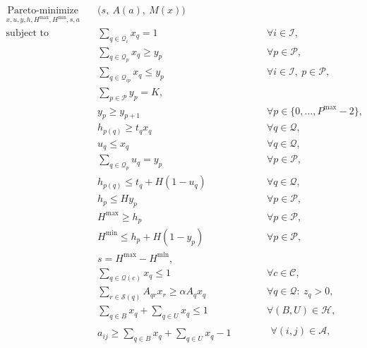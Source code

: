 \documentclass[11pt]{article}
\newcommand{\Item}{\mathcal{I}}
\newcommand{\Pallet}{\mathcal{P}}
\newcommand{\Place}{\mathcal{Q}}
\newcommand{\Cell}{\mathcal{C}}
\newcommand{\Support}{\mathcal{S}}
\begin{document}
\begin{subequations}
\label{model:complete}
\begin{alignat}{3}
  \underset{x,u,y,h,H^{\max},H^{\min},s,a}{\operatorname{Pareto-minimize}}
  \quad & \bigl(s,\ A(a),\ M(x)\bigr)
  \label{model:objective}\\[0.3em]
  \text{subject to}\quad
  & \sum_{q\in\Place_i}x_q = 1
  && \qquad \forall i\in\Item,
  \label{model:place-once}\\
  & \sum_{q\in\Place_p}x_q \ge y_p
  && \qquad \forall p\in\Pallet,
  \label{model:pallet-nonempty}\\
  & \sum_{q\in\Place_{ip}}x_q \le y_p
  && \qquad \forall i\in\Item,\ p\in\Pallet,
  \label{model:item-pallet-link}\\
  & \sum_{p\in\Pallet}y_p = K,
  &&
  \label{model:exact-pallets}\\
  & y_p \ge y_{p+1}
  && \qquad \forall p\in\{0,\ldots,P^{\max}-2\},
  \label{model:pallet-symmetry}\\
  & h_{p(q)} \ge t_qx_q
  && \qquad \forall q\in\Place,
  \label{model:placement-height}\\
  & u_q\le x_q
  && \qquad \forall q\in\Place,
  \label{model:top-selected}\\
  & \sum_{q\in\Place_p}u_q=y_p
  && \qquad \forall p\in\Pallet,
  \label{model:one-top-certificate}\\
  & h_{p(q)}\le t_q+H(1-u_q)
  && \qquad \forall q\in\Place,
  \label{model:top-attainment}\\
  & h_p \le Hy_p
  && \qquad \forall p\in\Pallet,
  \label{model:unused-height}\\
  & H^{\max}\ge h_p
  && \qquad \forall p\in\Pallet,
  \label{model:max-height}\\
  & H^{\min}\le h_p+H(1-y_p)
  && \qquad \forall p\in\Pallet,
  \label{model:min-height}\\
  & s=H^{\max}-H^{\min},
  &&
  \label{model:spread}\\
  & \sum_{q\in\Place(c)}x_q\le1
  && \qquad \forall c\in\Cell,
  \label{model:cell-clique}\\
  & \sum_{r\in\Support(q)}A_{qr}x_r
      \ge \alpha A_qx_q
  && \qquad \forall q\in\Place:\ z_q>0,
  \label{model:support}\\
  & \sum_{q\in B}x_q+\sum_{q\in U}x_q\le1
  && \qquad \forall(B,U)\in\mathcal{H},
  \label{model:hard-relations}\\
  & a_{ij}\ge
      \sum_{q\in B}x_q+\sum_{q\in U}x_q-1
  && \qquad \substack{\forall(i,j)\in\mathcal{A},\\
}
\end{alignat}
\end{subequations}
\end{document}
